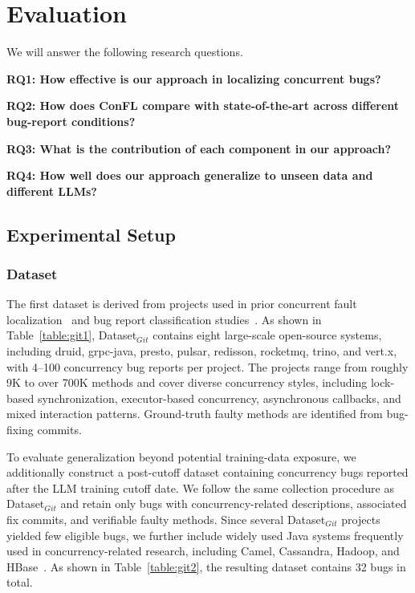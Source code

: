 \section{Evaluation}

We will answer the following research questions.  

\vspace*{3pt}
\noindent
{\bf RQ1: How effective is our approach in localizing concurrent bugs?}

\vspace*{3pt}
\noindent
{\bf RQ2: How does ConFL compare with state-of-the-art across different bug-report conditions?}

\vspace*{3pt}
\noindent
{\bf RQ3: What is the contribution of each component in our approach?}

\vspace*{3pt}
\noindent
{\bf RQ4:  How well does our approach generalize to unseen data and different LLMs?}

\subsection{Experimental Setup}


\subsubsection{Dataset}

The first dataset is derived from projects used in prior concurrent fault localization~\cite{shao2023information} and bug report classification studies~\cite{shao2026identifying}. As shown in Table~\ref{table:git1}, Dataset$_{Git}$ contains eight large-scale open-source systems, including druid, grpc-java, presto, pulsar, redisson, rocketmq, trino, and vert.x, with 4--100 concurrency bug reports per project. The projects range from roughly 9K to over 700K methods and cover diverse concurrency styles, including lock-based synchronization, executor-based concurrency, asynchronous callbacks, and mixed interaction patterns. Ground-truth faulty methods are identified from bug-fixing commits.



To evaluate generalization beyond potential training-data exposure, we additionally construct a post-cutoff dataset containing concurrency bugs reported after the LLM training cutoff date. We follow the same collection procedure as Dataset$_{Git}$ and retain only bugs with concurrency-related descriptions, associated fix commits, and verifiable faulty methods. Since several Dataset$_{Git}$ projects yielded few eligible bugs, we further include widely used Java systems frequently used in concurrency-related research, including Camel, Cassandra, Hadoop, and HBase~\cite{shao2023information, shao2026identifying}. As shown in Table~\ref{table:git2}, the resulting dataset contains 32 bugs in total.



